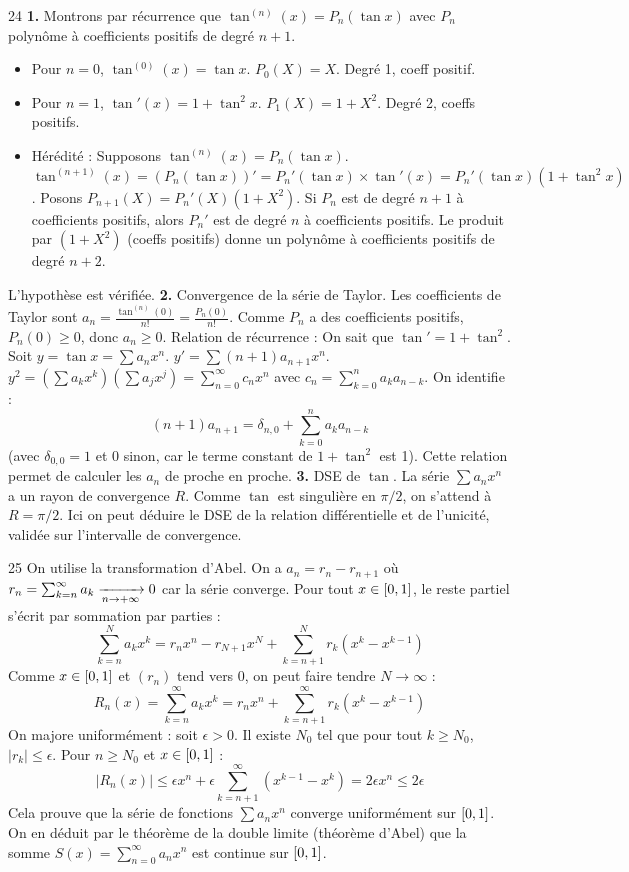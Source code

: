 \begin{correction}{24}
\textbf{1.} Montrons par récurrence que $\tan^{(n)}(x) = P_n(\tan x)$ avec $P_n$ polynôme à coefficients positifs de degré $n+1$. 
\begin{itemize}
 \item Pour $n=0$, $\tan^{(0)}(x) = \tan x$. $P_0(X) = X$. Degré 1, coeff positif. 
 \item Pour $n=1$, $\tan'(x) = 1 + \tan^2 x$. $P_1(X) = 1+X^2$. Degré 2, coeffs positifs. 
 \item Hérédité : Supposons $\tan^{(n)}(x) = P_n(\tan x)$. 
 $\tan^{(n+1)}(x) = (P_n(\tan x))' = P_n'(\tan x) \times \tan'(x) = P_n'(\tan x) (1+\tan^2 x)$. 
 Posons $P_{n+1}(X) = P_n'(X)(1+X^2)$. 
 Si $P_n$ est de degré $n+1$ à coefficients positifs, alors $P_n'$ est de degré $n$ à coefficients positifs. 
 Le produit par $(1+X^2)$ (coeffs positifs) donne un polynôme à coefficients positifs de degré $n+2$. 
\end{itemize}
L'hypothèse est vérifiée. 
\textbf{2.} Convergence de la série de Taylor. 
Les coefficients de Taylor sont $a_n = \frac{\tan^{(n)}(0)}{n!} = \frac{P_n(0)}{n!}$. 
Comme $P_n$ a des coefficients positifs, $P_n(0) \ge 0$, donc $a_n \ge 0$. 
Relation de récurrence : On sait que $\tan' = 1 + \tan^2$. 
Soit $y = \tan x = \sum a_n x^n$. $y' = \sum (n+1)a_{n+1} x^n$. 
$y^2 = \left( \sum a_k x^k \right) \left( \sum a_j x^j \right) = \sum_{n=0}^\infty c_n x^n$ avec $c_n = \sum_{k=0}^n a_k a_{n-k}$. 
On identifie :
$$ (n+1)a_{n+1} = \delta_{n,0} + \sum_{k=0}^n a_k a_{n-k} $$ 
(avec $\delta_{0,0}=1$ et 0 sinon, car le terme constant de $1+\tan^2$ est 1). 
Cette relation permet de calculer les $a_n$ de proche en proche. 
\textbf{3.} DSE de $\tan$. 
La série $\sum a_n x^n$ a un rayon de convergence $R$. 
Comme $\tan$ est singulière en $\pi/2$, on s'attend à $R = \pi/2$. 
Ici on peut déduire le DSE de la relation différentielle et de l'unicité, validée sur l'intervalle de convergence. 
\end{correction}

\begin{correction}{25}
On utilise la transformation d'Abel. 
On a $a_n = r_n - r_{n+1}$ où $r_n = \sum_{k=n}^\infty a_k \xrightarrow[n \to +\infty]{} 0$ car la série converge. 
Pour tout $x \in \left[0, 1\right]$, le reste partiel s'écrit par sommation par parties : 
$$ \sum_{k=n}^N a_k x^k = r_n x^n - r_{N+1}x^N + \sum_{k=n+1}^N r_k (x^k - x^{k-1}) $$
Comme $x \in \left[0, 1\right]$ et $(r_n)$ tend vers 0, on peut faire tendre $N \to \infty$ :
$$ R_n(x) = \sum_{k=n}^\infty a_k x^k = r_n x^n + \sum_{k=n+1}^\infty r_k (x^k - x^{k-1}) $$ 
On majore uniformément : soit $\epsilon > 0$. Il existe $N_0$ tel que pour tout $k \ge N_0$, $|r_k| \le \epsilon$. 
Pour $n \ge N_0$ et $x \in \left[0, 1\right]$ : 
$$ |R_n(x)| \le \epsilon x^n + \epsilon \sum_{k=n+1}^\infty (x^{k-1} - x^k) = 2\epsilon x^n \le 2\epsilon $$ 
Cela prouve que la série de fonctions $\sum a_n x^n$ converge uniformément sur $\left[0, 1\right]$. 
On en déduit par le théorème de la double limite (théorème d'Abel) que la somme $S(x) = \sum_{n=0}^\infty a_n x^n$ est continue sur $\left[0, 1\right]$. 
\end{correction}